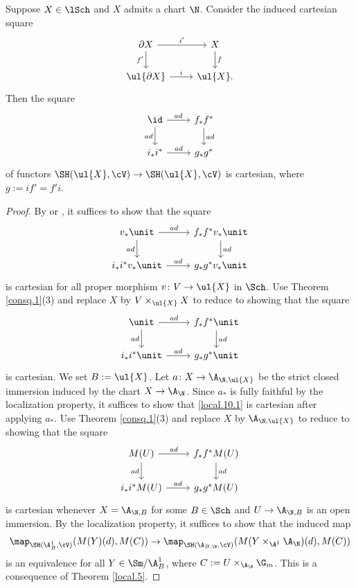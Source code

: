 \documentclass[10pt]{amsart}
\begin{document}
\begin{thm}
\label{local.10}
Suppose $X\in \lSch$ and $X$ admits a chart $\N$.
Consider the induced cartesian square
\[
\begin{tikzcd}
\partial X\ar[d,"f'"']\ar[r,"i'"]&
X\ar[d,"f"]
\\
\ul{\partial X}\ar[r,"i"]&
\ul{X}.
\end{tikzcd}
\]
Then the square
\[
\begin{tikzcd}
\id \ar[r,"ad"]\ar[d,"ad"']&
f_*f^*\ar[d,"ad"]
\\
i_*i^*\ar[r,"ad"]&
g_*g^*
\end{tikzcd}
\]
of functors $\SH(\ul{X},\cV)\to \SH(\ul{X},\cV)$ is cartesian, where $g:=if'=f'i$.
\end{thm}
\begin{proof}
By \cite[Lemma 2.2.23]{Ayo07} or \cite[Proposition 4.2.13]{CD19}, it suffices to show that the square
\[
\begin{tikzcd}
v_*\unit \ar[r,"ad"]\ar[d,"ad"']&
f_*f^*v_*\unit\ar[d,"ad"]
\\
i_*i^*v_*\unit\ar[r,"ad"]&
g_*g^*v_*\unit
\end{tikzcd}
\]
is cartesian for all proper morphism $v\colon V\to \ul{X}$ in $\Sch$.
Use Theorem \ref{consq.1}(3) and replace $X$ by $V\times_{\ul{X}}X$ to reduce to showing that the square
\begin{equation}
\label{local.10.1}
\begin{tikzcd}
\unit \ar[r,"ad"]\ar[d,"ad"']&
f_*f^*\unit\ar[d,"ad"]
\\
i_*i^*\unit\ar[r,"ad"]&
g_*g^*\unit
\end{tikzcd}
\end{equation}
is cartesian.
We set $B:=\ul{X}$.
Let $a\colon X\to \A_{\N,\ul{X}}$ be the strict closed immersion induced by the chart $X\to \A_{\N}$.
Since $a_*$ is fully faithful by the localization property, it suffices to show that \eqref{local.10.1} is cartesian after applying $a_*$.
Use Theorem \ref{consq.1}(3) and replace $X$ by $\A_{\N,\ul{X}}$ to reduce to showing that the square
\[
\begin{tikzcd}
M(U) \ar[r,"ad"]\ar[d,"ad"']&
f_*f^*M(U)\ar[d,"ad"]
\\
i_*i^*M(U)\ar[r,"ad"]&
g_*g^*M(U)
\end{tikzcd}
\]
is cartesian whenever $X=\A_{\N,B}$ for some $B\in \Sch$ and $U\to \A_{\N,B}$ is an open immersion.
By the localization property, it suffices to show that the induced map
\[
\map_{\SH(\A_B^1,\cV)}(M(Y)(d),M(C))
\to
\map_{\SH(\A_{B,\N},\cV)}(M(Y\times_{\A^1}\A_{\N})(d),M(C))
\]
is an equivalence for all $Y\in \Sm/\A_B^1$, where $C:=U\times_{\A_{\N}}\G_m$.
This is a consequence of Theorem \ref{local.5}.
\end{proof}
\end{document}
